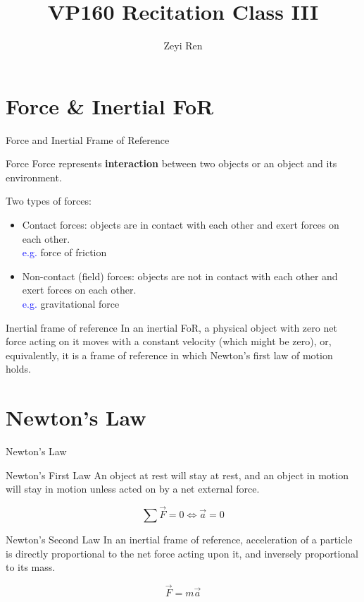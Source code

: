 \documentclass{beamer}
\title{VP160 Recitation Class III}
\author{Zeyi Ren}
\institute{UM-SJTU Joint Institute}
\begin{document}
\maketitle

\frame{\tableofcontents}

\section{Force \& Inertial FoR}
\begin{frame}{Force and Inertial Frame of Reference}
  \begin{block}{Force}
    Force represents \textbf{interaction} between two objects or an object and its environment. 
  \end{block}
  Two types of forces:\\
  \begin{itemize}
    \item Contact forces: objects are in contact with each other and exert forces on each other.\\
    \textcolor{blue}{e.g.} force of friction
    \item Non-contact (field) forces: objects are not in contact with each other and exert forces on each other.\\
    \textcolor{blue}{e.g.} gravitational force
  \end{itemize}
\end{frame}

\begin{frame}
  \begin{block}{Inertial frame of reference}
     In an inertial FoR, a physical object with zero net force acting on it moves with a constant velocity (which might be zero), or, equivalently, it is a frame of reference in which Newton's first law of motion holds.
  \end{block}
\end{frame}

\section{Newton's Law}
\begin{frame}{Newton's Law}
  \begin{block}{Newton's First Law}
    An object at rest will stay at rest, and an object in motion will stay in motion unless acted on by a net external force.
  \end{block}
  $$
  \sum{\vec{F}} = 0 \Leftrightarrow \vec{a} = 0
  $$
  \begin{block}{Newton's Second Law}
    In an inertial frame of reference, acceleration of a particle is directly proportional to the net force acting upon it, and inversely proportional to its mass.
  \end{block}
  $$
  \vec{F} = m\vec{a}
  $$
\end{frame}
\end{document}
